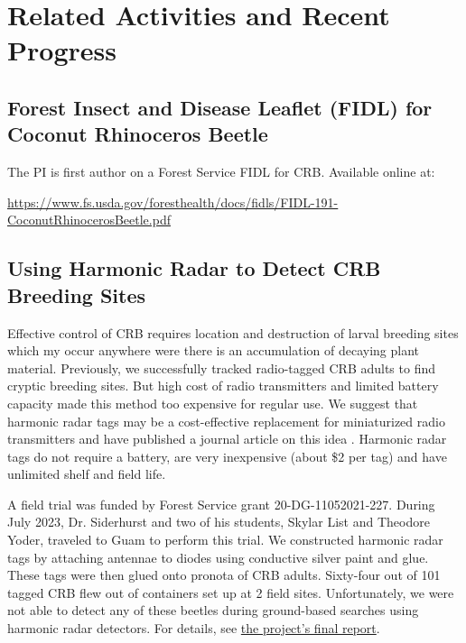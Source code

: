 \documentclass[12pt,letterpaper,english,bibliography=totocnumbered, abstract=on]{scrartcl}
\begin{document}
\clearpage

\section{Related Activities and Recent Progress}

\subsection{Forest Insect and Disease Leaflet (FIDL) for Coconut Rhinoceros Beetle}

The PI is first author on a Forest Service FIDL for CRB. Available online at: \\
\begin{footnotesize}
\url{https://www.fs.usda.gov/foresthealth/docs/fidls/FIDL-191-CoconutRhinocerosBeetle.pdf} 
\end{footnotesize}

\subsection{Using Harmonic Radar to Detect CRB Breeding Sites}

Effective control of CRB requires location and destruction of larval breeding sites which my occur anywhere were there is an accumulation of decaying plant material. Previously, we successfully tracked radio-tagged CRB adults to find cryptic breeding sites. But high cost of radio transmitters and limited battery capacity made this method too expensive for regular use. We suggest that harmonic radar tags may be a cost-effective replacement for miniaturized radio transmitters and have published a journal article on this idea \cite{mooreProposalDetectingCoconut2022}. Harmonic radar tags do not require a battery, are very inexpensive (about \$2 per tag) and have unlimited shelf and field life.

A field trial was funded by Forest Service grant 20-DG-11052021-227.
During July 2023, Dr. Siderhurst and two of his students, Skylar List and Theodore Yoder, traveled to Guam to perform this trial. We constructed harmonic radar tags by attaching antennae to diodes using conductive silver paint and glue. These tags were then glued onto pronota of CRB adults. Sixty-four out of 101 tagged CRB flew out of containers set up at 2 field sites. Unfortunately, we were not able to detect any of these beetles during ground-based searches using harmonic radar detectors. For details, see \href{https://github.com/aubreymoore/Harmonic-Radar/blob/master/final-report-202212/final-report-202212.pdf}{the project's final report}. 
\end{document}
